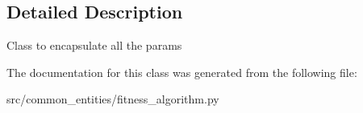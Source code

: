 \subsection{Detailed Description}
\begin{DoxyVerb}
Class to encapsulate all the params
\end{DoxyVerb}
 

The documentation for this class was generated from the following file:\begin{DoxyCompactItemize}
\item 
src/common\_\-entities/fitness\_\-algorithm.py\end{DoxyCompactItemize}
